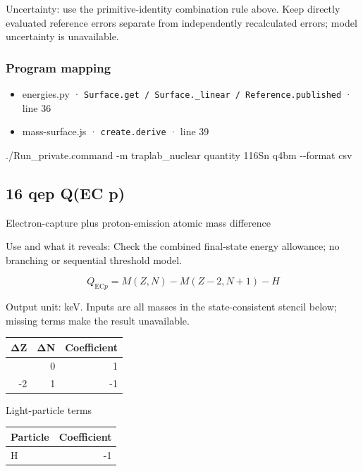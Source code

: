 \documentclass[
  11pt,
  letterpaper,
]{article}
\newenvironment{Shaded}{}{}
\newcommand{\AttributeTok}[1]{\textcolor[rgb]{0.49,0.56,0.16}{#1}}
\newcommand{\ExtensionTok}[1]{#1}
\newcommand{\NormalTok}[1]{#1}
\providecommand{\tightlist}{%
  \setlength{\itemsep}{0pt}\setlength{\parskip}{0pt}}
\begin{document}
Uncertainty: use the primitive-identity combination rule above. Keep
directly evaluated reference errors separate from independently
recalculated errors; model uncertainty is unavailable.

\subsubsection{Program mapping}\label{program-mapping-14}

\begin{itemize}
\tightlist
\item
  energies.py ·
  \texttt{Surface.get\ /\ Surface.\_linear\ /\ Reference.published} ·
  line 36
\item
  mass-surface.js · \texttt{create.derive} · line 39
\end{itemize}

\begin{Shaded}
\begin{Highlighting}[]
\ExtensionTok{./Run\_private.command} \AttributeTok{{-}m}\NormalTok{ traplab\_nuclear quantity 116Sn q4bm }\AttributeTok{{-}{-}format}\NormalTok{ csv}
\end{Highlighting}
\end{Shaded}

\subsection{16 qep Q(EC p)}\label{qep-qec-p}

Electron-capture plus proton-emission atomic mass difference

Use and what it reveals: Check the combined final-state energy
allowance; no branching or sequential threshold model.

\[
Q_{{\mathrm{EC}}p}=M(Z,N)-M(Z-2,N+1)-H
\]

Output unit: keV. Inputs are all masses in the state-consistent stencil
below; missing terms make the result unavailable.

\begin{longtable}[]{@{}rrr@{}}
\toprule\noalign{}
ΔZ & ΔN & Coefficient \\
\midrule\noalign{}
\endhead
\bottomrule\noalign{}
\endlastfoot
0 & 0 & 1 \\
-2 & 1 & -1 \\
\end{longtable}

Light-particle terms

\begin{longtable}[]{@{}lr@{}}
\toprule\noalign{}
Particle & Coefficient \\
\midrule\noalign{}
\endhead
\bottomrule\noalign{}
\endlastfoot
H & -1 \\
\end{longtable}
\end{document}
